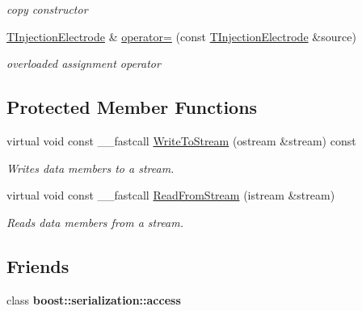 \begin{DoxyCompactItemize}
\begin{DoxyCompactList}\small\item\em copy constructor \end{DoxyCompactList}\item 
\hypertarget{class_t_injection_electrode_a7eccc985aa8ae9c6f81c1aa618286a2f}{\hyperlink{class_t_injection_electrode}{T\+Injection\+Electrode} \& \hyperlink{class_t_injection_electrode_a7eccc985aa8ae9c6f81c1aa618286a2f}{operator=} (const \hyperlink{class_t_injection_electrode}{T\+Injection\+Electrode} \&source)}\label{class_t_injection_electrode_a7eccc985aa8ae9c6f81c1aa618286a2f}

\begin{DoxyCompactList}\small\item\em overloaded assignment operator \end{DoxyCompactList}\end{DoxyCompactItemize}
\subsection*{Protected Member Functions}
\begin{DoxyCompactItemize}
\item 
\hypertarget{class_t_injection_electrode_ac2358b8eca327bb7678b191ba36d7976}{virtual void const \+\_\+\+\_\+fastcall \hyperlink{class_t_injection_electrode_ac2358b8eca327bb7678b191ba36d7976}{Write\+To\+Stream} (ostream \&stream) const }\label{class_t_injection_electrode_ac2358b8eca327bb7678b191ba36d7976}

\begin{DoxyCompactList}\small\item\em Writes data members to a stream. \end{DoxyCompactList}\item 
\hypertarget{class_t_injection_electrode_a0eb782e62fe8505ac067d67d3dad88a2}{virtual void const \+\_\+\+\_\+fastcall \hyperlink{class_t_injection_electrode_a0eb782e62fe8505ac067d67d3dad88a2}{Read\+From\+Stream} (istream \&stream)}\label{class_t_injection_electrode_a0eb782e62fe8505ac067d67d3dad88a2}

\begin{DoxyCompactList}\small\item\em Reads data members from a stream. \end{DoxyCompactList}\end{DoxyCompactItemize}
\subsection*{Friends}
\begin{DoxyCompactItemize}
\item 
\hypertarget{class_t_injection_electrode_ac98d07dd8f7b70e16ccb9a01abf56b9c}{class {\bfseries boost\+::serialization\+::access}}\label{class_t_injection_electrode_ac98d07dd8f7b70e16ccb9a01abf56b9c}

\end{DoxyCompactItemize}


